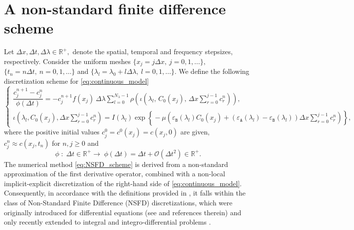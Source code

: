 \documentclass[a4paper, UKenglish, numberwithinsect, thm-restate]{tgdk-v2021}
\begin{document}
\section{A non-standard finite difference scheme}\label{sec:NSFD}
Let $\Delta x, \Delta t, \Delta \lambda\in \mathbb{R}^+,$ denote the spatial, temporal and frequency stepsizes, respectively. Consider the uniform meshes $\{x_j=j \Delta x, \ j=0,1,\dots \},$ $\{t_n=n \Delta t, \ n=0,1,\dots \}$ and $\{\lambda_l=\lambda_{0}+l \Delta \lambda, \ l=0,1,\dots \}.$ We define the following discretization scheme for \eqref{eq:continuous_model}
\begin{equation}\label{eq:NSFD_scheme}
    \begin{cases}
        \displaystyle\dfrac{c_j^{n+1}-c_j^n}{\phi(\Delta t)}=- c_j^{n+1} f(x_j) \ \Delta \lambda \! \sum_{l=0} ^{N_\lambda-1} \! \rho\left(\iota\left(\lambda_l,\, C_0(x_j) ,\, \Delta x \sum_{r=0}^{j-1}c_r^n \right)\right), 
        \\
        \displaystyle \! \iota \! \left(\lambda_l, C_0(x_j) , \Delta x \sum_{r=0}^{j-1}c_r^n \!\right) \! =I(\lambda_l) \exp \! \left\{ \! - \mu \! \left(  \varepsilon_\texttt{B}(\lambda_l) C_0(x_j) +  (\varepsilon_\texttt{A}(\lambda_l) -\varepsilon_\texttt{B}(\lambda_l))  \Delta x \sum_{r=0}^{j-1}c_r^n  \right) \! \right\} ,
    \end{cases}
\end{equation}
where the positive initial values $c_j^0=c^0(x_j)=c(x_j,0)$ are given, $c_j^n\approx c(x_j,t_n)$ for $n,j\geq 0$ and
\begin{equation}\label{eq:prop_phi}
    \phi \; : \; \Delta t\in \mathbb{R}^+ \longrightarrow \; \phi(\Delta t)=\Delta t + \mathcal{O}(\Delta t^2)\in \mathbb{R}^+.
\end{equation}
The numerical method \eqref{eq:NSFD_scheme} is derived from a non-standard approximation of the first derivative operator, combined with a non-local implicit-explicit discretization of the right-hand side of \eqref{eq:continuous_model}. Consequently, in accordance with the definitions provided in \cite{Anguelov, SUNDAY}, it falls within the class of Non-Standard Finite Difference (NSFD) discretizations, which were originally introduced for differential equations (see \cite{Mickens_PDE,Mickens_Book_Old,Mickens_Book} and references therein) and only recently extended to integral and integro-differential problems \cite{Buonomo_2024,Lubuma2015, MPV_JCD, MPV_MBE, Pandey_2015}.
\end{document}
